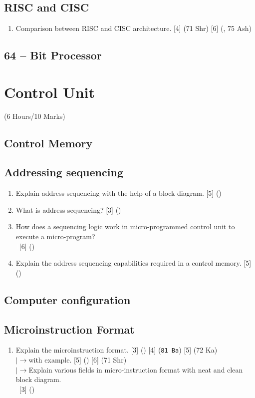\documentclass[12pt]{article}
\newcommand{\lb}{\\$\left|\rightarrow\right.$}
\newcommand{\enter}{\\\textcolor{white}{1}}
\begin{document}
	\subsection{RISC and CISC}
	\begin{enumerate}[noitemsep, topsep = 0pt]
		\item Comparison between RISC and CISC architecture. \hfill [4] (71 Shr) [6] (, 75 Ash)
	\end{enumerate}
	\subsection{64 – Bit Processor}

	\pagebreak
\section{Control Unit}
	\begin{center}(6 Hours/10 Marks)\end{center} 
	\subsection{Control Memory}
	
	\subsection{Addressing sequencing}
		\begin{enumerate}
			\item Explain address sequencing with the help of a block diagram. \hfill [5] ()
			
			\item What is address sequencing? \hfill [3] ()
			
			\item How does a sequencing logic work in micro-programmed control unit to execute a micro-program?
			\enter\hfill [6] ()
			\item Explain the address sequencing capabilities required in a control memory. \hfill [5] ()
		\end{enumerate}
	
	\subsection{Computer configuration}
	
	\subsection{Microinstruction Format}
		\begin{enumerate}[noitemsep, topsep=0pt]
			\item Explain the microinstruction format.  \hfill [3] () [4] (\texttt{81 Ba}) [5] (72 Ka)
			\lb with example. \hfill [5] () [6] (71 Shr)
			\lb Explain various fields in micro-instruction format with neat and clean block diagram.
			\enter\hfill [3] ()
		\end{enumerate}
		
\end{document}
